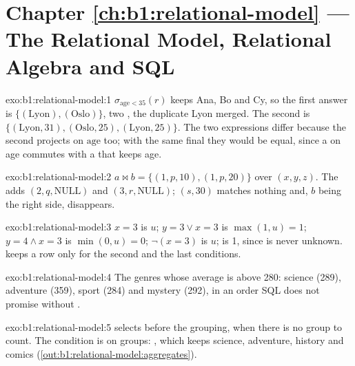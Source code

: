 \section*{Chapter \ref{ch:b1:relational-model} --- The Relational Model, Relational Algebra and SQL}

\begin{solution}{exo:b1:relational-model:1}
$\sigma_{\text{age} < 35}(r)$ keeps Ana, Bo and Cy, so the first answer is $\{(\text{Lyon}), (\text{Oslo})\}$, two ,
the duplicate Lyon merged. The second is $\{(\text{Lyon}, 31), (\text{Oslo}, 25), (\text{Lyon}, 25)\}$. The two
expressions differ because the second projects on $\text{age}$ too; with the same final  they would be equal,
since a  on age commutes with a  that keeps age.
\end{solution}

\begin{solution}{exo:b1:relational-model:2}
$a \bowtie b = \{(1, p, 10), (1, p, 20)\}$ over $(x, y, z)$. The  adds $(2, q, \text{NULL})$ and $(3, r,
\text{NULL})$; $(s, 30)$ matches nothing and, $b$ being the right side, disappears.
\end{solution}

\begin{solution}{exo:b1:relational-model:3}
$x = 3$ is $u$; $y = 3 \vee x = 3$ is $\max(1, u) = 1$; $y = 4 \wedge x = 3$ is $\min(0, u) = 0$; $\neg(x = 3)$ is $u$;
 is 1, since  is never unknown.  keeps a row only for the second and the last
conditions.
\end{solution}

\begin{solution}{exo:b1:relational-model:4}
The genres whose average is above 280: science (289), adventure (359), sport (284) and mystery (292), in an order SQL
does not promise without .
\end{solution}

\begin{solution}{exo:b1:relational-model:5}
 selects  before the grouping, when there is no group to count. The condition is on groups:
, which keeps science, adventure, history and
comics (\cref{out:b1:relational-model:aggregates}).
\end{solution}

